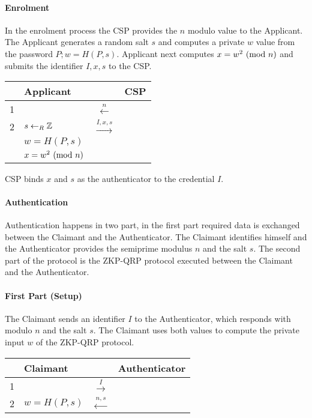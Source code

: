 \paragraph{Enrolment} In the enrolment process the CSP provides the $n$ modulo value to the Applicant.
The Applicant generates a random salt $s$ and computes a private $w$ value from the password $P; w = H(P, s)$.
Applicant next computes $x = w^2 \ (\mathrm{mod}\ n)$ and submits the identifier $I, x, s$ to the CSP.

\bigskip

\begin{center}
	\begin{tabular}{rl|c|l}
		& Applicant & & CSP\\
		\hline
		1 & & $\xleftarrow{n}$ \\
		2 & $s \leftarrow_R \Bbb{Z}$ & $\xrightarrow{I, x, s}$ \\ & $w = H(P, s)$ & \\ & $x = w^2 \ (\mathrm{mod}\ n)$ &
	\end{tabular}
\end{center}

\bigskip

CSP binds $x$ and $s$ as the authenticator to the credential $I$.

\paragraph{Authentication}

Authentication happens in two part, in the first part required data is exchanged between the Claimant and the Authenticator. The Claimant identifies himself and the Authenticator provides the semiprime modulus $n$ and the salt $s$.
The second part of the protocol is the ZKP-QRP \cite{GMR} protocol executed between the Claimant and the Authenticator.
\bigskip

\paragraph{First Part (Setup)}

The Claimant sends an identifier $I$ to the Authenticator, which responds with modulo $n$ and the salt $s$. The Claimant uses both values to compute the private input $w$ of the ZKP-QRP protocol.

\bigskip


\begin{center}
	\begin{tabular}{rl|c|l}
  		& Claimant & & Authenticator\\
  		\hline
		1 & & $\xrightarrow{I}$ & \\
		2 & $w = H(P, s)$ & $\xleftarrow{n, s}$ & \\
	\end{tabular}
\end{center}

